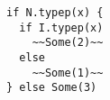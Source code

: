 \begin{lstlisting}[style=reclojureScala]
if N.typep(x) {
  if I.typep(x)
    ~~Some(2)~~
  else
    ~~Some(1)~~
} else Some(3)
\end{lstlisting}
